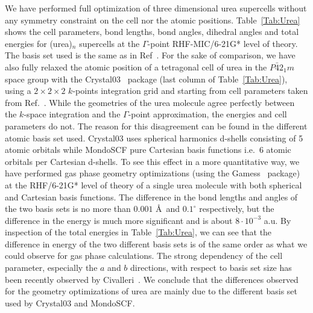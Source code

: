 \documentclass[prl,twocolumn,showpacs,twocolumngrid,superbib]{revtex4}
\begin{document}
We have performed full optimization of three dimensional urea supercells 
without any symmetry constraint on the cell nor the atomic positions.
Table~\ref{Tab:Urea} shows the cell parameters, bond lengths, 
bond angles, dihedral angles and total energies
for (urea)$_n$ supercells at the $\Gamma$-point RHF-MIC/6-21G* level of
theory. The basis set used is the same as in Ref~\cite{RDovesi90}.
For the sake of comparison, we have also fully relaxed the atomic position of a tetragonal cell
of urea in the $P\bar{4}2_1m$ space group with the 
{\sc Crystal03}~\cite{Crystal03} package (last column of Table~\ref{Tab:Urea}), using a $2\times 2\times 2$ $k$-points 
integration grid and starting from cell parameters taken from Ref.~\cite{KDoll04}.
While the geometries of the urea molecule agree perfectly between the $k$-space integration
and the $\Gamma$-point approximation, the energies and cell parameters do not.
The reason for this disagreement can be found in the different atomic basis set used.
{\sc Crystal03} uses spherical harmonics d-shells consisting of 5 atomic orbitals while {\sc MondoSCF} 
pure Cartesian basis functions i.e.~6 atomic orbitals per Cartesian d-shells. To see this effect in a more
quantitative way, we have performed gas phase geometry optimizations 
(using the {\sc Gamess}~\cite{gamess} package) at the RHF/6-21G* level of theory 
of a single urea molecule with both spherical and Cartesian basis functions.
The difference in the bond lengths and angles of the two basis sets 
is no more than $0.001$ \AA~and $0.1^\circ$ respectively, but the
difference in the energy is much more significant and is about $8\cdot 10^{-3}$ a.u.
By inspection of the total energies in Table~\ref{Tab:Urea}, we can see that the difference
in energy of the two different basis sets is of the same order as what we could observe
for gas phase calculations. The strong dependency of the cell parameter, especially
the $a$ and $b$ directions, with respect to basis set size has been recently observed by 
Civalleri~\cite{BCivalleri05}. We conclude that the differences observed for the geometry
optimizations of urea are mainly due to the different basis set used by {\sc Crystal03} and 
{\sc MondoSCF}.
%
\end{document}
